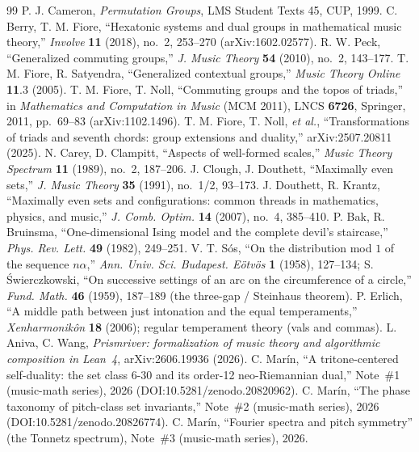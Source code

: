 \documentclass[11pt]{article}
\begin{document}
\begin{thebibliography}{99}
 P. J. Cameron, \emph{Permutation Groups}, LMS Student Texts 45, CUP, 1999.
 C. Berry, T. M. Fiore, ``Hexatonic systems and dual groups in mathematical music
  theory,'' \emph{Involve} \textbf{11} (2018), no.~2, 253--270 (arXiv:1602.02577).
 R. W. Peck, ``Generalized commuting groups,'' \emph{J. Music Theory} \textbf{54}
  (2010), no.~2, 143--177.
 T. M. Fiore, R. Satyendra, ``Generalized contextual groups,'' \emph{Music Theory
  Online} \textbf{11}.3 (2005).
 T. M. Fiore, T. Noll, ``Commuting groups and the topos of triads,'' in
  \emph{Mathematics and Computation in Music} (MCM 2011), LNCS \textbf{6726}, Springer, 2011,
  pp.~69--83 (arXiv:1102.1496).
 T. M. Fiore, T. Noll, \emph{et al.}, ``Transformations of triads and seventh
  chords: group extensions and duality,'' arXiv:2507.20811 (2025).
 N. Carey, D. Clampitt, ``Aspects of well-formed scales,'' \emph{Music
  Theory Spectrum} \textbf{11} (1989), no.~2, 187--206.
 J. Clough, J. Douthett, ``Maximally even sets,'' \emph{J. Music Theory}
  \textbf{35} (1991), no.~1/2, 93--173.
 J. Douthett, R. Krantz, ``Maximally even sets and configurations: common
  threads in mathematics, physics, and music,'' \emph{J. Comb. Optim.} \textbf{14} (2007), no.~4,
  385--410.
 P. Bak, R. Bruinsma, ``One-dimensional Ising model and the complete devil's
  staircase,'' \emph{Phys. Rev. Lett.} \textbf{49} (1982), 249--251.
 V. T. S\'os, ``On the distribution mod $1$ of the sequence $n\alpha$,''
  \emph{Ann. Univ. Sci. Budapest. E\"otv\"os} \textbf{1} (1958), 127--134; S. \'Swierczkowski,
  ``On successive settings of an arc on the circumference of a circle,'' \emph{Fund. Math.}
  \textbf{46} (1959), 187--189 (the three-gap / Steinhaus theorem).
 P. Erlich, ``A middle path between just intonation and the equal temperaments,''
  \emph{Xenharmonik\^on} \textbf{18} (2006); regular temperament theory (vals and commas).
 L. Aniva, C. Wang, \emph{Prismriver: formalization of music theory and
  algorithmic composition in Lean~4}, arXiv:2606.19936 (2026).
 C. Mar\'in, ``A tritone-centered self-duality: the set class 6-30 and its
  order-12 neo-Riemannian dual,'' Note~\#1 (music-math series), 2026
  (DOI:10.5281/zenodo.20820962).
 C. Mar\'in, ``The phase taxonomy of pitch-class set invariants,'' Note~\#2
  (music-math series), 2026 (DOI:10.5281/zenodo.20826774).
 C. Mar\'in, ``Fourier spectra and pitch symmetry'' (the Tonnetz spectrum),
  Note~\#3 (music-math series), 2026.
\end{thebibliography}
\end{document}
